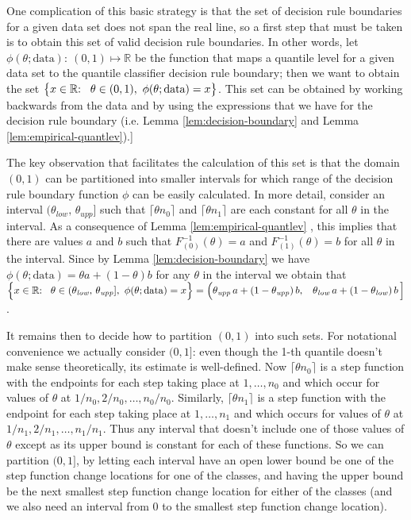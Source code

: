 One complication of this basic strategy is that the set of decision rule
boundaries for a given data set does not span the real line, so a first step
that must be taken is to obtain this set of valid decision rule boundaries.  In
other words, let $\phi(\theta; \text{data}){:}~ (0, 1) \mapsto \mathbb{R}$ be
the function that maps a quantile level for a given data set to the quantile
classifier decision rule boundary; then we want to obtain the set
$\big\{ x \in \mathbb{R}{:} \hspace{3mm} \theta \in (0, 1),~ \phi(\theta;
\text{data}) = x \big\}$.  This set can be obtained by working backwards from
the data and by using the expressions that we have for the decision rule
boundary (i.e. Lemma \ref{lem:decision-boundary} and Lemma
\ref{lem:empirical-quantlev}).]

The key observation that facilitates the calculation of this set is that the
domain $(0, 1)$ can be partitioned into smaller intervals for which range of the
decision rule boundary function $\phi$ can be easily calculated.  In more
detail, consider an interval $(\theta_{\mathit{low}},\, \theta_{\mathit{upp}}]$
such that $\lceil \theta n_0 \rceil$ and $\lceil \theta n_1 \rceil$ are each
constant for all $\theta$ in the interval.  As a consequence of Lemma
\ref{lem:empirical-quantlev} , this implies that there are values $a$ and $b$
such that $F_{(0)}^{-1}(\theta) = a$ and $F_{(1)}^{-1}(\theta) = b$ for all
$\theta$ in the interval.  Since by Lemma \ref{lem:decision-boundary} we have
$\phi(\theta; \text{data}) = \theta a + (1 - \theta) b$ for any $\theta$ in the
interval we obtain that
$\Big\{ x \in \mathbb{R}{:} \hspace{3mm} \theta \in (\theta_{\mathit{low}},\,
\theta_{\mathit{upp}}],~ \phi(\theta; \text{data}) = x \Big\} = \Big(
\theta_{\mathit{upp}}\, a + (1 - \theta_{\mathit{upp}})\, b, \hspace{3mm}
\theta_{\mathit{low}}\, a + (1 - \theta_{\mathit{low}})\, b\, \Big]$.

It remains then to decide how to partition $(0, 1)$ into such sets.  For
notational convenience we actually consider $(0, 1]$: even though the 1-th
quantile doesn't make sense theoretically, its estimate is well-defined.  Now
$\lceil \theta n_0 \rceil$ is a step function with the endpoints for each step
taking place at $1, \dots, n_0$ and which occur for values of $\theta$ at
$1 / n_0, 2 / n_0, \dots, n_0 / n_0$.  Similarly, $\lceil \theta n_1 \rceil$ is
a step function with the endpoint for each step taking place at $1, \dots, n_1$
and which occurs for values of $\theta$ at $1 / n_1, 2 / n_1, \dots, n_1 / n_1$.
Thus any interval that doesn't include one of those values of $\theta$ except as
its upper bound is constant for each of these functions.  So we can partition
$(0, 1]$, by letting each interval have an open lower bound be one of the step
function change locations for one of the classes, and having the upper bound be
the next smallest step function change location for either of the classes (and
we also need an interval from 0 to the smallest step function change location).

